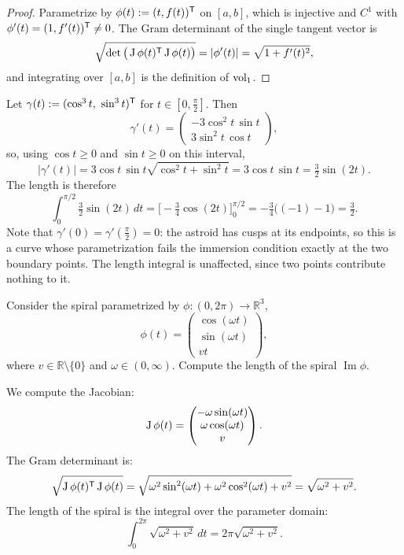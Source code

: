 \begin{proof}
Parametrize by $\phi(t) := (t, f(t))^{\mathsf{T}}$ on $[a,b]$, which is injective and $C^1$ with
$\phi'(t) = (1, f'(t))^{\mathsf{T}} \neq 0$. The Gram determinant of the single tangent vector is
\[\sqrt{\det\big(\operatorname{J}\phi(t)^{\mathsf{T}}\operatorname{J}\phi(t)\big)} = |\phi'(t)|
  = \sqrt{1+f'(t)^2},\]
and integrating over $[a,b]$ is the definition of $\operatorname{vol}_1$.
\end{proof}

\begin{example}
\label{ex:astroid_arc_length}
Let $\gamma(t) := (\cos^3t,\ \sin^3t)^{\mathsf{T}}$ for $t \in [0,\tfrac\pi2]$. Then
\[\gamma'(t) = \begin{pmatrix} -3\cos^2t\,\sin t \\ 3\sin^2t\,\cos t\end{pmatrix},\]
so, using $\cos t \geq 0$ and $\sin t \geq 0$ on this interval,
\[|\gamma'(t)| = 3\cos t\,\sin t\sqrt{\cos^2t+\sin^2t} = 3\cos t\,\sin t
  = \tfrac32\sin(2t).\]
The length is therefore
\[\int_0^{\pi/2}\tfrac32\sin(2t)\,dt = \Big[-\tfrac34\cos(2t)\Big]_0^{\pi/2}
  = -\tfrac34\big((-1)-1\big) = \tfrac32.\]
Note that $\gamma'(0) = \gamma'(\tfrac\pi2) = 0$: the astroid has cusps at its endpoints, so this
is a curve whose parametrization fails the immersion condition exactly at the two boundary
points. The length integral is unaffected, since two points contribute nothing to it.
\end{example}

\begin{example}
\label{ex:spiral_length}
Consider the spiral parametrized by $\phi : (0,2\pi) \to \mathbb{R}^3$,
\[\phi(t) = \begin{pmatrix} \cos(\omega t) \\ \sin(\omega t) \\ vt \end{pmatrix},\]
where $v \in \mathbb{R}\setminus\{0\}$ and $\omega \in (0,\infty)$. Compute the length of the spiral $\operatorname{Im}\phi$.

We compute the Jacobian:
\[\operatorname{J}\phi(t) = \begin{pmatrix} -\omega\sin(\omega t) \\ \omega\cos(\omega t) \\ v \end{pmatrix}.\]
The Gram determinant is:
\[\sqrt{\operatorname{J}\phi(t)^{\mathsf{T}} \operatorname{J}\phi(t)} = \sqrt{\omega^2\sin^2(\omega t) + \omega^2\cos^2(\omega t) + v^2} = \sqrt{\omega^2 + v^2}.\]
The length of the spiral is the integral over the parameter domain:
\[\int_0^{2\pi} \sqrt{\omega^2 + v^2} \,dt = 2\pi\sqrt{\omega^2 + v^2}.\]
\end{example}

